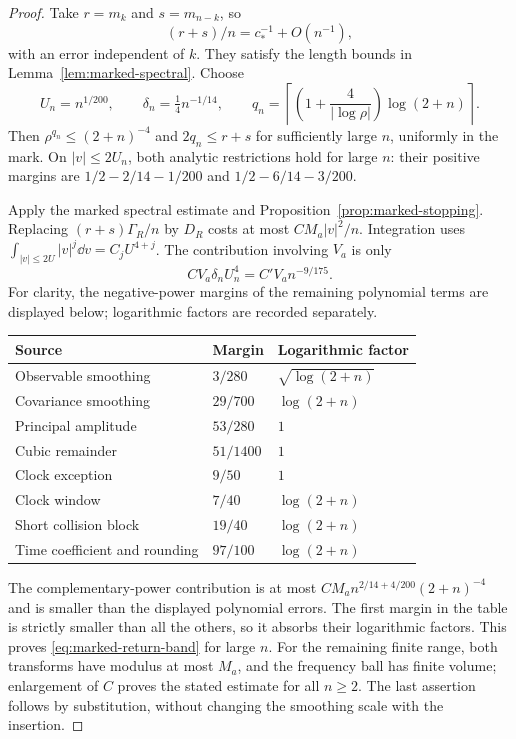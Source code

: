 \begin{proof}
Take $r=m_k$ and $s=m_{n-k}$, so
\[
 (r+s)/n=c_*^{-1}+O(n^{-1}),
\]
with an error independent of $k$. They satisfy the length bounds in
Lemma~\ref{lem:marked-spectral}. Choose
\begin{equation}\label{eq:marked-scales}
 U_n=n^{1/200},\qquad \delta_n=\tfrac14n^{-1/14},\qquad
 q_n=\left\lceil\left(1+\frac4{|\log\rho|}\right)\log(2+n)\right\rceil.
\end{equation}
Then $\rho^{q_n}\le(2+n)^{-4}$ and $2q_n\le r+s$ for sufficiently
large $n$, uniformly in the mark. On $|v|\le2U_n$, both analytic
restrictions hold for large $n$: their positive margins are
$1/2-2/14-1/200$ and $1/2-6/14-3/200$.

Apply the marked spectral estimate and
Proposition~\ref{prop:marked-stopping}. Replacing $(r+s)\Gamma_R/n$
by $D_R$ costs at most $C M_a|v|^2/n$. Integration uses
$\int_{|v|\le2U}|v|^j\dd v=C_jU^{4+j}$. The contribution involving
$V_a$ is only
\[
 C V_a\delta_nU_n^4=C'V_an^{-9/175}.
\]
For clarity, the negative-power margins of the remaining polynomial
terms are displayed below; logarithmic factors are recorded separately.
\begin{center}
\begin{tabular}{lll}
Source & Margin & Logarithmic factor\\ \hline
Observable smoothing & $3/280$ & $\sqrt{\log(2+n)}$\\
Covariance smoothing & $29/700$ & $\log(2+n)$\\
Principal amplitude & $53/280$ & $1$\\
Cubic remainder & $51/1400$ & $1$\\
Clock exception & $9/50$ & $1$\\
Clock window & $7/40$ & $\log(2+n)$\\
Short collision block & $19/40$ & $\log(2+n)$\\
Time coefficient and rounding & $97/100$ & $\log(2+n)$
\end{tabular}
\end{center}
The complementary-power contribution is at most
$C M_an^{2/14+4/200}(2+n)^{-4}$ and is smaller than the displayed
polynomial errors. The first margin in the table is strictly smaller
than all the others, so it absorbs their logarithmic factors.
This proves \eqref{eq:marked-return-band} for large $n$. For the
remaining finite range, both transforms have modulus at most $M_a$,
and the frequency ball has finite volume; enlargement of $C$ proves
the stated estimate for all $n\ge2$. The last assertion follows by
substitution, without changing the smoothing scale with the insertion.
\end{proof}

